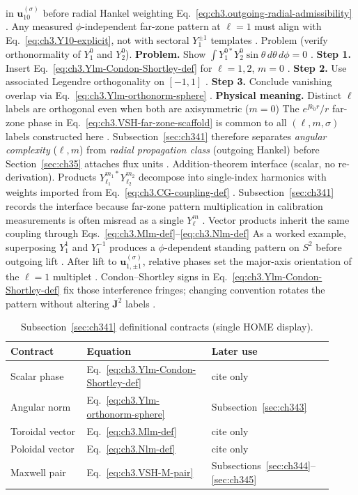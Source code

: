in \(\mathbf{u}_{10}^{(\sigma)}\) before radial Hankel weighting Eq.~\eqref{eq:ch3.outgoing-radial-admissibility}
. Any measured \(\phi\)-independent far-zone pattern at \(\ell=1\) must align with
Eq.~\eqref{eq:ch3.Y10-explicit}, not with sectoral \(Y_{1}^{\pm1}\) templates .
Problem (verify orthonormality of \(Y_{1}^{0}\) and \(Y_{2}^{0}\)). \textbf{Problem.} Show \(\int Y_{1}^{0*}Y_{2}^{0}\sin\theta\,d\theta\,d\phi=0\) .
\textbf{Step 1.} Insert Eq.~\eqref{eq:ch3.Ylm-Condon-Shortley-def} for \(\ell=1,2\), \(m=0\) .
\textbf{Step 2.} Use associated Legendre orthogonality on \([-1,1]\) .
\textbf{Step 3.} Conclude vanishing overlap via Eq.~\eqref{eq:ch3.Ylm-orthonorm-sphere} .
\textbf{Physical meaning.} Distinct \(\ell\) labels are orthogonal even when both are axisymmetric (\(m=0\))
The \(e^{\jj k_{0}r}/r\) far-zone phase in Eq.~\eqref{eq:ch3.VSH-far-zone-scaffold} is common to all
\((\ell,m,\sigma)\) labels constructed here . Subsection~\ref{sec:ch341} therefore
separates \emph{angular complexity} (\(\ell,m\)) from \emph{radial propagation class} (outgoing Hankel) before
Section~\ref{sec:ch35} attaches flux units .
Addition-theorem interface (scalar, no re-derivation). Products \(Y_{\ell_1}^{m_1*}Y_{\ell_2}^{m_2}\) decompose into single-index harmonics with weights imported from
Eq.~\eqref{eq:ch3.CG-coupling-def} . Subsection~\ref{sec:ch341} records the interface
because far-zone pattern multiplication in calibration measurements is often misread as a single \(Y_{\ell}^{m}\)
. Vector products inherit the same coupling through Eqs.~\eqref{eq:ch3.Mlm-def}--\eqref{eq:ch3.Nlm-def}
As a worked example, superposing \(Y_{1}^{1}\) and \(Y_{1}^{-1}\) produces a \(\phi\)-dependent standing pattern on \(S^{2}\) before outgoing
lift . After lift to \(\mathbf{u}_{1,\pm1}^{(\sigma)}\), relative phases set the
major-axis orientation of the \(\ell=1\) multiplet . Condon--Shortley signs in
Eq.~\eqref{eq:ch3.Ylm-Condon-Shortley-def} fix those interference fringes; changing convention rotates the pattern
without altering \(\mathbf{J}^{2}\) labels .
\begin{table}[t]
\centering
\caption{Subsection~\ref{sec:ch341} definitional contracts (single HOME display).}
\label{tab:ch3.341-def-contracts}
\small
\begin{tabular}{@{}p{0.22\linewidth}p{0.36\linewidth}p{0.34\linewidth}@{}}
\toprule
Contract & Equation & Later use \\
\midrule
Scalar phase & Eq.~\eqref{eq:ch3.Ylm-Condon-Shortley-def} & cite only \\
Angular norm & Eq.~\eqref{eq:ch3.Ylm-orthonorm-sphere} & Subsection~\ref{sec:ch343} \\
Toroidal vector & Eq.~\eqref{eq:ch3.Mlm-def} & cite only \\
Poloidal vector & Eq.~\eqref{eq:ch3.Nlm-def} & cite only \\
Maxwell pair & Eq.~\eqref{eq:ch3.VSH-M-pair} & Subsections~\ref{sec:ch344}--\ref{sec:ch345} \\
\bottomrule
\end{tabular}
\end{table}
